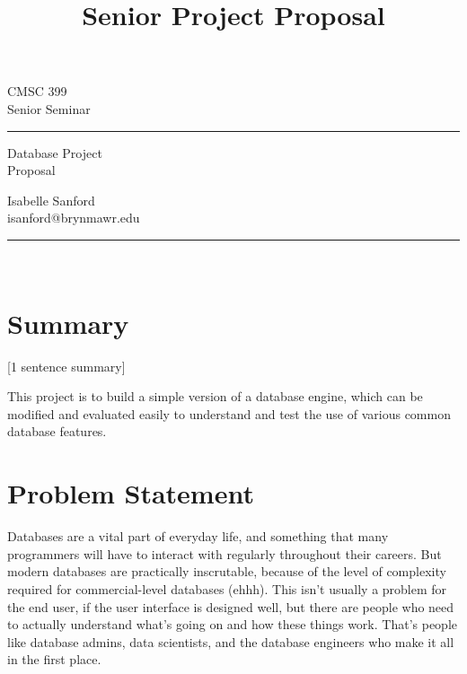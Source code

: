 \documentclass[12pt, oneside]{amsart} %
\begin{document}

\title{Senior Project Proposal} %

\begin{minipage}{0.295\textwidth} %
\raggedright
CMSC 399\\ %
\footnotesize %
Senior Seminar %
\medskip\hrule
\end{minipage}
\begin{minipage}{0.4\textwidth} %
\centering 
\large %
Database Project\\ %
\normalsize 
Proposal \\ %
\end{minipage}
\begin{minipage}{0.295\textwidth} %
\raggedleft
Isabelle Sanford \\%
\footnotesize 
isanford@brynmawr.edu
\medskip\hrule
\end{minipage}\\

\section{Summary}

[1 sentence summary]

This project is to build a simple version of a database engine, which can be modified and evaluated easily to understand and test the use of various common database features. 


\section{Problem Statement}
Databases are a vital part of everyday life, and something that many programmers will have to interact with regularly throughout their careers. But modern databases are practically inscrutable, because of the level of complexity required for commercial-level databases (ehhh). This isn't usually a problem for the end user, if the user interface is designed well, but there are people who need to actually understand what's going on and how these things work. That's people like database admins, data scientists, and the database engineers who make it all in the first place. 
\end{document}
